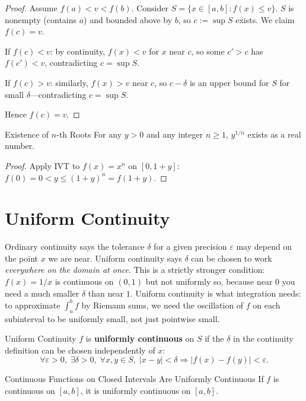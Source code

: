 \documentclass[12pt, openany]{book}
\theoremstyle{plain}
\theoremstyle{definition}
\theoremstyle{remark}
\newcommand{\eps}{\varepsilon}
\newcommand{\del}{\delta}
\begin{document}
\begin{proof}
Assume $f(a) < v < f(b)$. Consider $S = \{x \in [a,b] : f(x) \leq v\}$. $S$ is nonempty (contains $a$) and bounded above by $b$, so $c := \sup S$ exists. We claim $f(c) = v$.

If $f(c) < v$: by continuity, $f(x) < v$ for $x$ near $c$, so some $c' > c$ has $f(c') < v$, contradicting $c = \sup S$.

If $f(c) > v$: similarly, $f(x) > v$ near $c$, so $c - \del$ is an upper bound for $S$ for small $\del$---contradicting $c = \sup S$.

Hence $f(c) = v$.
\end{proof}

\begin{corbox}{Existence of $n$-th Roots}
For any $y > 0$ and any integer $n \geq 1$, $y^{1/n}$ exists as a real number.
\end{corbox}
\color{black}

\begin{proof}
Apply IVT to $f(x) = x^n$ on $[0, 1 + y]$: $f(0) = 0 < y \leq (1+y)^n = f(1+y)$.
\end{proof}

\section{Uniform Continuity}

Ordinary continuity says the tolerance $\delta$ for a given precision $\varepsilon$ may depend on the point $x$ we are near.  Uniform continuity says $\delta$ can be chosen to work \emph{everywhere on the domain at once}.  This is a strictly stronger condition: $f(x) = 1/x$ is continuous on $(0,1)$ but not uniformly so, because near $0$ you need a much smaller $\delta$ than near $1$.  Uniform continuity is what integration needs: to approximate $\int_a^b f$ by Riemann sums, we need the oscillation of $f$ on each subinterval to be uniformly small, not just pointwise small.

\begin{defbox}{Uniform Continuity}
$f$ is \textbf{uniformly continuous} on $S$ if the $\del$ in the continuity definition can be chosen independently of $x$:
\[ \forall \eps > 0,\; \exists \del > 0,\; \forall x, y \in S,\; |x - y| < \del \Rightarrow |f(x) - f(y)| < \eps. \]
\end{defbox}
\color{black}

\begin{thmbox}{Continuous Functions on Closed Intervals Are Uniformly Continuous}
If $f$ is continuous on $[a, b]$, it is uniformly continuous on $[a, b]$.
\end{thmbox}
\color{black}
\end{document}
